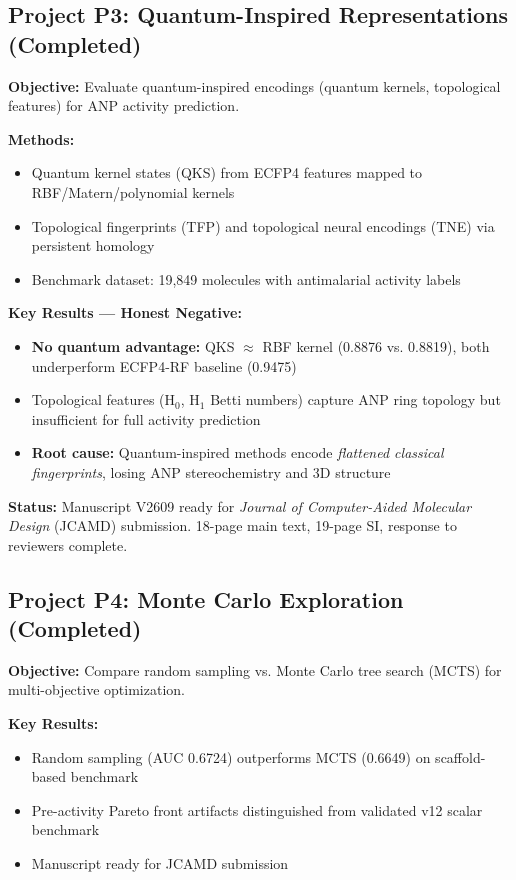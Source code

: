 \documentclass[11pt,a4paper]{article}
\begin{document}
\subsection{Project P3: Quantum-Inspired Representations (Completed)}

\textbf{Objective:} Evaluate quantum-inspired encodings (quantum kernels, topological features) for ANP activity prediction.

\textbf{Methods:}
\begin{itemize}
    \item Quantum kernel states (QKS) from ECFP4 features mapped to RBF/Matern/polynomial kernels
    \item Topological fingerprints (TFP) and topological neural encodings (TNE) via persistent homology
    \item Benchmark dataset: 19,849 molecules with antimalarial activity labels
\end{itemize}

\textbf{Key Results — Honest Negative:}
\begin{itemize}
    \item \textbf{No quantum advantage:} QKS $\approx$ RBF kernel (0.8876 vs. 0.8819), both underperform ECFP4-RF baseline (0.9475)
    \item Topological features (H$_0$, H$_1$ Betti numbers) capture ANP ring topology but insufficient for full activity prediction
    \item \textbf{Root cause:} Quantum-inspired methods encode \textit{flattened classical fingerprints}, losing ANP stereochemistry and 3D structure
\end{itemize}

\textbf{Status:} Manuscript V2609 ready for \textit{Journal of Computer-Aided Molecular Design} (JCAMD) submission. 18-page main text, 19-page SI, response to reviewers complete.

\subsection{Project P4: Monte Carlo Exploration (Completed)}

\textbf{Objective:} Compare random sampling vs. Monte Carlo tree search (MCTS) for multi-objective optimization.

\textbf{Key Results:}
\begin{itemize}
    \item Random sampling (AUC 0.6724) outperforms MCTS (0.6649) on scaffold-based benchmark
    \item Pre-activity Pareto front artifacts distinguished from validated v12 scalar benchmark
    \item Manuscript ready for JCAMD submission
\end{itemize}
\end{document}
